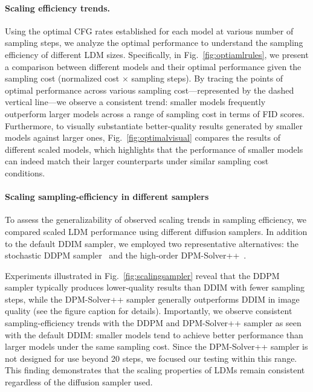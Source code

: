 \paragraph{Scaling efficiency trends.}
%
Using the optimal CFG rates established for each model at various number of sampling steps, we analyze the optimal performance to understand the sampling efficiency of different LDM sizes.
%
Specifically, in Fig.~\ref{fig:optiamlrules}, we present a comparison between different models and their optimal performance given the sampling cost (normalized cost $\times$ sampling steps).
By tracing the points of optimal performance across various sampling cost---represented by the dashed vertical line---we observe a consistent trend: smaller models frequently outperform larger models across a range of sampling cost in terms of FID scores.
Furthermore, to visually substantiate better-quality results generated by smaller models against larger ones, Fig.~\ref{fig:optimalvisual} compares the results of different scaled models, which highlights that the performance of smaller models can indeed match their larger counterparts under similar sampling cost conditions.


\paragraph{Scaling sampling-efficiency in different samplers}
%
To assess the generalizability of observed scaling trends in sampling efficiency, we compared scaled LDM performance using different diffusion samplers. In addition to the default DDIM sampler, we employed two representative alternatives: the stochastic DDPM sampler~\cite{ho2020denoising} and the high-order DPM-Solver++~\cite{lu2022dpm2}.

Experiments illustrated in Fig.~\ref{fig:scalingsampler} reveal that the DDPM sampler typically produces lower-quality results than DDIM with fewer sampling steps, while the DPM-Solver++ sampler generally outperforms DDIM in image quality (see the figure caption for details).
%
Importantly, we observe consistent sampling-efficiency trends with the DDPM and DPM-Solver++ sampler as seen with the default DDIM: smaller models tend to achieve better performance than larger models under the same sampling cost. Since the DPM-Solver++ sampler is not designed for use beyond 20 steps, we focused our testing within this range.
%
This finding demonstrates that the scaling properties of LDMs remain consistent regardless of the diffusion sampler used.
%


